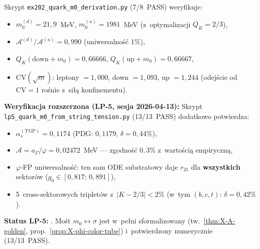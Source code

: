 \begin{remark}%
\label{rem:X-m0-numerical}
Skrypt \texttt{ex202\_quark\_m0\_derivation.py} (7/8~PASS) weryfikuje:
\begin{itemize}[nosep]
  \item $m_0^{(d)} = 21{,}9$~MeV, $m_0^{(u)} = 1981$~MeV
    (z~optymalizacji $Q_K = 2/3$),
  \item $\mathcal{A}^{(d)}/\mathcal{A}^{(u)} = 0{,}990$
    (uniwersalno\'s\'c $1\%$),
  \item $Q_K(\text{down} + m_0) = 0{,}66666$,
    $Q_K(\text{up} + m_0) = 0{,}66667$,
  \item $\mathrm{CV}(\sqrt{m})$: leptony $= 1{,}000$,
    down $= 1{,}093$, up $= 1{,}244$
    (odej\'scie od $\mathrm{CV}=1$ ro\'snie z~si\l{}\k{a} konfinementu).
\end{itemize}

\medskip\noindent
\textbf{Weryfikacja rozszerzona (LP-5, sesja 2026-04-13):}
Skrypt \texttt{lp5\_quark\_m0\_from\_string\_tension.py} (13/13~PASS)
dodatkowo potwierdza:
\begin{itemize}[nosep]
  \item $\alpha_s^{\mathrm{(TGP)}} = 0{,}1174$
    (PDG: $0{,}1179$, $\delta = 0{,}44\%$),
  \item $\mathcal{A} = a_\Gamma/\varphi = 0{,}02472$~MeV
    --- zgodno\'s\'c $0{,}3\%$ z~warto\'sci\k{a} empiryczn\k{a},
  \item $\varphi$-FP uniwersalno\'s\'c:
    ten sam ODE substratowy daje $r_{21}$ dla \textbf{wszystkich}
    sektor\'ow ($g_0 \in [0{,}817;\, 0{,}891]$),
  \item 5~cross-sektorowych triplet\'ow z~$|K - 2/3| < 2\%$
    (w~tym $(b,c,t)$: $\delta = 0{,}42\%$).
\end{itemize}
\textbf{Status LP-5:} .
Mo\'st $m_0 \leftrightarrow \sigma$ jest w~pe\l{}ni sformalizowany
(tw.~\ref{thm:X-A-golden}, prop.~\ref{prop:X-phi-color-tube})
i~potwierdzony numerycznie (13/13~PASS).
\end{remark}
